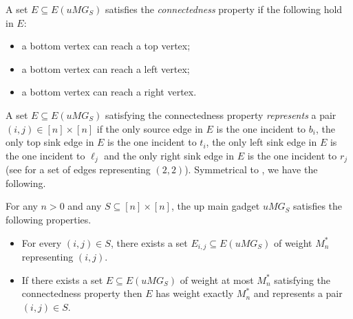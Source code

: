 \noindent
A set $E \subseteq E(uMG_S)$ satisfies the \emph{connectedness} property if the following hold in $E$: 
\begin{itemize}
\item a bottom vertex can reach a top vertex;
\item a bottom vertex can reach a left vertex;
\item a bottom vertex can reach a right vertex.
\end{itemize}
A set $E \subseteq E(uMG_S)$ satisfying the connectedness property \emph{represents} a pair $(i,j) \in [n] \times [n]$ if the only source edge in $E$ is the one incident to $b_i$, the only top sink edge in $E$ is the one incident to $t_i$, the only left sink edge in $E$ is the one incident to $\ell_j$ and the only right sink edge in $E$ is the one incident to $r_j$ (see  for a set of edges representing $(2,2)$). Symmetrical to , we have the following.

\begin{lemma}
\label{lem:umg}
For any $n > 0$ and any $S \subseteq [n] \times [n]$, the up main gadget $uMG_S$ satisfies the following properties.
\begin{itemize}
\item[(1)] For every $(i,j) \in S$, there exists a set $E_{i,j} \subseteq E(uMG_S)$ of weight $M_n^*$ representing $(i,j)$.
\item[(2)] If there exists a set $E \subseteq E(uMG_S)$ of weight at most $M_n^*$ satisfying the connectedness property then $E$ has weight exactly $M_n^*$ and represents a pair $(i,j) \in S$.
\end{itemize}
\end{lemma}


